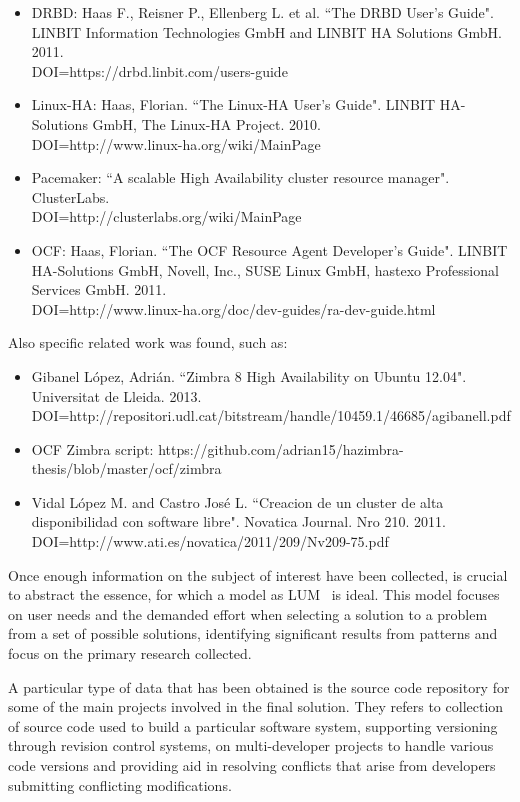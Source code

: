 \documentclass[a4paper, 12pt]{book}
\begin{document}
\begin{itemize}
	\item DRBD: Haas F., Reisner P., Ellenberg L. et al. ``The DRBD User's Guide". LINBIT Information Technologies GmbH and LINBIT HA Solutions GmbH. 2011.\\
	DOI=https://drbd.linbit.com/users-guide
	\item Linux-HA: Haas, Florian. ``The Linux-HA User's Guide". LINBIT HA-Solutions GmbH, The Linux-HA Project. 2010. \\
	DOI=http://www.linux-ha.org/wiki/MainPage
	\item Pacemaker: ``A scalable High Availability cluster resource manager". ClusterLabs. \\
	DOI=http://clusterlabs.org/wiki/MainPage
	\item OCF: Haas, Florian. ``The OCF Resource Agent Developer's Guide". LINBIT HA-Solutions GmbH, Novell, Inc., SUSE Linux GmbH, hastexo Professional Services GmbH. 2011. \\
        DOI=http://www.linux-ha.org/doc/dev-guides/ra-dev-guide.html
\end{itemize}

\noindent Also specific related work was found, such as:

\begin{itemize}
	\item Gibanel L\'opez, Adri\'an. ``Zimbra 8 High Availability on Ubuntu 12.04". Universitat de Lleida. 2013. DOI=http://repositori.udl.cat/bitstream/handle/10459.1/46685/agibanell.pdf
	\item OCF Zimbra script: https://github.com/adrian15/hazimbra-thesis/blob/master/ocf/zimbra
	\item Vidal L\'opez M. and Castro Jos\'e L. ``Creacion de un cluster de alta disponibilidad con software libre". Novatica Journal. Nro 210. 2011. \\
	DOI=http://www.ati.es/novatica/2011/209/Nv209-75.pdf
\end{itemize}

\noindent Once enough information on the subject of interest have been collected, is crucial to abstract the essence, for which a model as LUM~\cite{CandT1} is ideal. This model focuses on user needs and the demanded effort when selecting a solution to a problem from a set of possible solutions, identifying significant results from patterns and focus on the primary research collected.\bigskip

\noindent A particular type of data that has been obtained is the source code repository for some of the main projects involved in the final solution. They refers to collection of source code used to build a particular software system, supporting versioning through revision control systems, on multi-developer projects to handle various code versions and providing aid in resolving conflicts that arise from developers submitting conflicting modifications.
\end{document}
